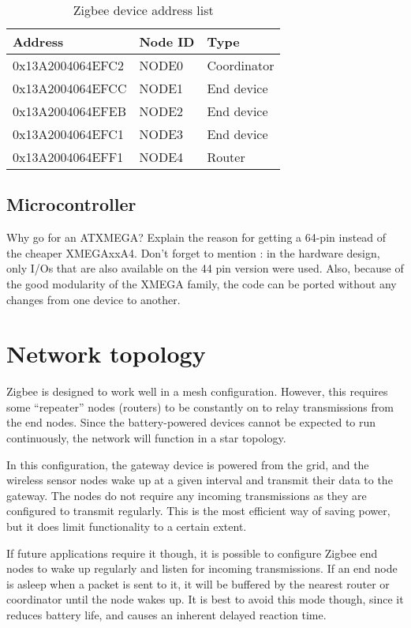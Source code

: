\begin{table}[h]
  \centering
  \begin{tabular}{l|l|l}
    Address & Node ID & Type \\
    \hline
    0x13A2004064EFC2 & NODE0 & Coordinator \\
    0x13A2004064EFCC & NODE1 & End device \\
    0x13A2004064EFEB & NODE2 & End device \\
    0x13A2004064EFC1 & NODE3 & End device \\
    0x13A2004064EFF1 & NODE4 & Router \\
  \end{tabular}
  \caption{Zigbee device address list}
  \label{tab:addresses}
\end{table}

\subsection{Microcontroller}
Why go for an ATXMEGA?
Explain the reason for getting a 64-pin instead of the cheaper XMEGAxxA4.
Don't forget to mention : in the hardware design, only I/Os that are also
available on the 44 pin version were used. Also, because of the good modularity
of the XMEGA family, the code can be ported without any changes from one device
to another.


\section{Network topology}

Zigbee is designed to work well in a mesh configuration. However, this requires
some ``repeater'' nodes (routers) to be constantly on to relay transmissions
from the end nodes. Since the battery-powered devices cannot be expected to run
continuously, the network will function in a star topology.

In this configuration, the gateway device is powered from the grid, and the
wireless sensor nodes wake up at a given interval and transmit their data to the
gateway. The nodes do not require any incoming transmissions as they are
configured to transmit regularly. This is the most efficient way of saving
power, but it does limit functionality to a certain extent.

If future applications require it though, it is possible to configure Zigbee end
nodes to wake up regularly and listen for incoming transmissions. If an end node
is asleep when a packet is sent to it, it will be buffered by the nearest router
or coordinator until the node wakes up. It is best to avoid this mode though,
since it reduces battery life, and causes an inherent delayed reaction time.

